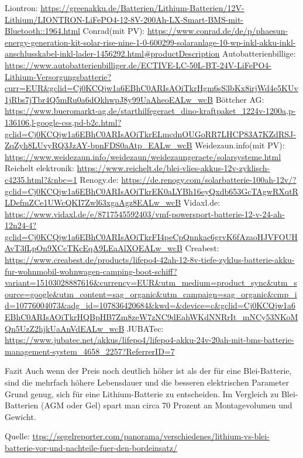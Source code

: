 Liontron: 		\url{https://greenakku.de/Batterien/Lithium-Batterien/12V-Lithium/LIONTRON-LiFePO4-12-8V-200Ah-LX-Smart-BMS-mit-Bluetooth::1964.html}
Conrad(mit PV):		\url{https://www.conrad.de/de/p/phaesun-energy-generation-kit-solar-rise-nine-1-0-600299-solaranlage-10-wp-inkl-akku-inkl-anschlusskabel-inkl-lader-1456292.html#productDescription}
Autobatterienbillige:	\url{https://www.autobatterienbilliger.de/ECTIVE-LC-50L-BT-24V-LiFePO4-Lithium-Versorgungsbatterie?curr=EUR&gclid=Cj0KCQjw1a6EBhC0ARIsAOiTkrHgm6sS3bKx8irjWd4e5KUv1jRbs7jTbr4Q5mRu0a6dOkhwpJ8y99UaAheoEALw_wcB}
Böttcher AG:		\url{https://www.bueromarkt-ag.de/starthilfegeraet_dino-kraftpaket_1224v-1200a,p-136106,l-google-css,pd-b2c.html?gclid=Cj0KCQjw1a6EBhC0ARIsAOiTkrELmcdnOUGoRR7LHCP83A7KZdRSJ-ZqZyh8LUvyRQ3JzAY-bpnFDS0aAtp_EALw_wcB}
Weidezaun.info(mit PV):	\url{https://www.weidezaun.info/weidezaun/weidezaungeraete/solarsysteme.html}
Reichelt elektronik:	\url{https://www.reichelt.de/blei-vlies-akkus-12v-zyklisch-c4235.html?&nbc=1}
Renogy.de:		\url{https://de.renogy.com/solarbatterie-100ah-12v/?gclid=Cj0KCQjw1a6EBhC0ARIsAOiTkrEK0aLYBh16eyQxdb653GcTAgwRXqtRLDefmZCe1UWcQKI7Zwl63xgaAgz8EALw_wcB}
Vidaxl.de:		\url{https://www.vidaxl.de/e/8717545592403/vmf-powersport-batterie-12-v-24-ah-12n24-4?gclid=Cj0KCQjw1a6EBhC0ARIsAOiTkrFI4peCpQnnkac6grvK6fAzaoHJVFOUHAvT3fLpOn9XCcTKcEqA9LEaAlXOEALw_wcB}
Creabest:		\url{https://www.creabest.de/products/lifepo4-42ah-12-8v-tiefe-zyklus-batterie-akku-fur-wohnmobil-wohnwagen-camping-boot-schiff?variant=15103028887616&currency=EUR&utm_medium=product_sync&utm_source=google&utm_content=sag_organic&utm_campaign=sag_organic&cmp_id=10776004073&adg_id=107836420684&kwd=&device=c&gclid=Cj0KCQjw1a6EBhC0ARIsAOiTkrHQBpHB7Zm8zeW7zNC9dEahWKdNNRrIt_mNCy53NKoMQn5UzZ2hjkUaAnVdEALw_wcB}
JUBATec:		\url{https://www.jubatec.net/akkus/lifepo4/lifepo4-akku-24v-20ah-mit-bms-batterie-management-system_4658_2257?ReferrerID=7}



Fazit
Auch wenn der Preis noch deutlich höher ist als der für eine Blei-Batterie, sind die mehrfach höhere Lebensdauer und die besseren elektrischen Parameter Grund genug,
sich für eine Lithium-Batterie zu entscheiden. 
Im Vergleich zu Blei-Batterien (AGM oder Gel) spart man circa 70 Prozent an Montagevolumen und Gewicht.

Quelle: \url{ttps://segelreporter.com/panorama/verschiedenes/lithium-vs-blei-batterie-vor-und-nachteile-fuer-den-bordeinsatz/}